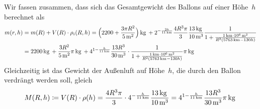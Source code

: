 \documentclass[../full]{subfiles}
\newcommand\Unit[2][\,]{
    \, \mathrm{#2}^{#1}
}
\newcommand\kg{\Unit{kg}}
\newcommand\m[1][]{\Unit[#1]{m}}
\newcommand\km[1][]{\Unit[#1]{km}}
\begin{document}
    Wir fassen zusammen, dass sich das Gesamtgewicht des Ballons
    auf einer H\"ohe~\( h \) berechnet als
    \begin{align*}
        m \paren{r, h} &
        = m \paren{R} + V \paren{R} \cdot \rho_i \paren{R, h}
        = \paren[\Big]{2200 + \frac{3 \pi R^2}{5 \m[2]}} \kg
        + 2^{-\frac{2h}{11 \km}} \frac{4 R^3 \pi}{3} \frac{13 \kg}{10 \m[3]}
            \frac
                {1}
                {1 + \frac{1 \km \cdot 10^6 \m[2]}{R^2 \paren{5763 \km - 130h}}}
        \\ &
        = 2200 \kg + \frac{3 R^2}{5 \m[2]} \pi \kg
            + 4^{1 - \frac{h}{11 \km}} \frac{13 R^3}{30 \m[3]} \cdot \frac
                {1}
                {
                    1 + \frac
                        {1 \km \cdot 10^6 \m[2]}
                        {R^2 \paren{5763 \km - 130h}}
                } \pi \kg
    \end{align*}
    Gleichzeitig ist das Gewicht der Au\ss enluft auf H\"ohe~\( h \),
    die durch den Ballon verdr\"angt werden soll,
    gleich
    \begin{equation*}
        M \paren{R, h}
        \coloneqq V \paren{R} \cdot \rho \paren{h}
        = \frac{4 R^3 \pi}{3}
            \cdot 4^{-\frac{h}{11 \km}} \frac{13 \kg}{10 \m[3]}
        = 4^{1 - \frac{h}{11 \km}} \frac{13 R^3}{30 \m[3]} \pi \kg
    \end{equation*}
\end{document}
